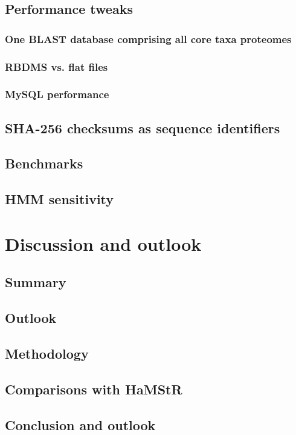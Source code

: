 \documentclass[a4paper]{scrreprt}
\newcommand{\hamstr}{HaMStR\xspace}
\begin{document}
	\section{Performance tweaks}
		\subsection{One BLAST database comprising all core taxa proteomes}
			
		\subsection{RBDMS vs. flat files}
		\subsection{MySQL performance}
	\section{SHA-256 checksums as sequence identifiers}
		
	\section{Benchmarks}
	\section{HMM sensitivity}

\chapter{Discussion and outlook}
	\section{Summary}
	\section{Outlook}
\clearpage

\section{Methodology}
\clearpage

\section{Comparisons with \hamstr}
\clearpage

\section{Conclusion and outlook}
\clearpage
\end{document}
